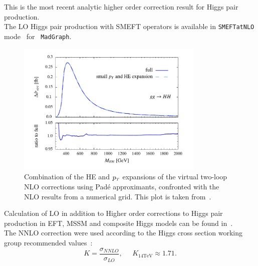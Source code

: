 This is the most recent analytic higher order correction result for Higgs pair production.\\
%
The LO Higgs pair production with SMEFT operators is available in \texttt{SMEFTatNLO} mode~\cite{Degrande:2020evl} for ~\texttt{MadGraph}.

\begin{figure}[!htpb]
	\centering
	\includegraphics[width = 0.8\textwidth]{./figures/HH_NLO}
	\caption{Combination of the HE and $p_{\scriptscriptstyle T}$ expansions of the virtual two-loop NLO corrections using  Pad\'e  approximants,  confronted with the NLO results from a numerical grid. This plot is taken from~\cite{Bellafronte:2022jmo}. } 
	\label{dihiggs-gridplot}
\end{figure}
%
Calculation of LO in addition to Higher order corrections to Higgs pair production in EFT, MSSM and composite Higgs models can be found in~\cite{Grober:2010yv,Grober:2015cwa,Grober:2017gut,deFlorian:2017qfk,Buchalla:2018yce}.\\ 
The NNLO correction were used according to the Higgs cross section working group recommended values~\cite{Dittmaier:2012vm,deFlorian:2016spz}:
\begin{equation}
	K = \frac{\sigma_{NNLO}}{\sigma_{LO}}, \;\;\;\;\; K_{14 \mathrm{TeV}} \approx 1.71.
\end{equation}
